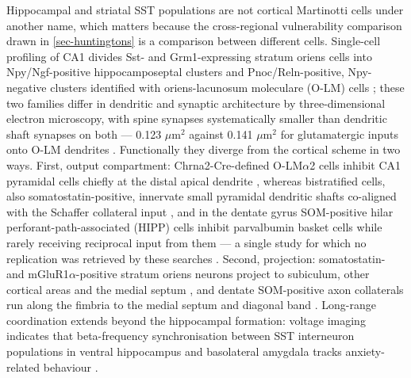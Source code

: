 \documentclass[11pt]{article}
\begin{document}
Hippocampal and striatal SST populations are not cortical Martinotti cells under another name, which matters because the cross-regional vulnerability comparison drawn in \ref{sec-huntingtons} is a comparison between different cells. Single-cell profiling of CA1 divides Sst- and Grm1-expressing stratum oriens cells into Npy/Ngf-positive hippocamposeptal clusters and Pnoc/Reln-positive, Npy-negative clusters identified with oriens-lacunosum moleculare (O-LM) cells \citep{Harris2018}; these two families differ in dendritic and synaptic architecture by three-dimensional electron microscopy, with spine synapses systematically smaller than dendritic shaft synapses on both --- 0.123 $\mu$m$^{2}$ against 0.141 $\mu$m$^{2}$ for glutamatergic inputs onto O-LM dendrites \citep{Takacs2024}. Functionally they diverge from the cortical scheme in two ways. First, output compartment: Chrna2-Cre-defined O-LM$\alpha$2 cells inhibit CA1 pyramidal cells chiefly at the distal apical dendrite \citep{Leao2012}, whereas bistratified cells, also somatostatin-positive, innervate small pyramidal dendritic shafts co-aligned with the Schaffer collateral input \citep{Klausberger2003}, and in the dentate gyrus SOM-positive hilar perforant-path-associated (HIPP) cells inhibit parvalbumin basket cells while rarely receiving reciprocal input from them --- a single study for which no replication was retrieved by these searches \citep{Savanthrapadian2014}. Second, projection: somatostatin- and mGluR1$\alpha$-positive stratum oriens neurons project to subiculum, other cortical areas and the medial septum \citep{Jinno2007}, and dentate SOM-positive axon collaterals run along the fimbria to the medial septum and diagonal band \citep{Yuan2017}. Long-range coordination extends beyond the hippocampal formation: voltage imaging indicates that beta-frequency synchronisation between SST interneuron populations in ventral hippocampus and basolateral amygdala tracks anxiety-related behaviour \citep{Jackson2024}.
\end{document}
